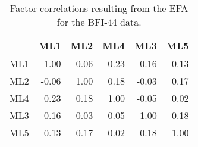 \begin{table}[ht]
\centering
\begin{tabular}{rrrrrr}
  \toprule
 & {\textbf{ML1}} & {\textbf{ML2}} & {\textbf{ML4}} & {\textbf{ML3}} & {\textbf{ML5}} \\ 
  \midrule
ML1 & 1.00 & -0.06 & 0.23 & -0.16 & 0.13 \\ 
  ML2 & -0.06 & 1.00 & 0.18 & -0.03 & 0.17 \\ 
  ML4 & 0.23 & 0.18 & 1.00 & -0.05 & 0.02 \\ 
  ML3 & -0.16 & -0.03 & -0.05 & 1.00 & 0.18 \\ 
  ML5 & 0.13 & 0.17 & 0.02 & 0.18 & 1.00 \\ 
   \bottomrule
\end{tabular}
\caption{Factor correlations resulting from the EFA for the BFI-44 data.} 
\label{tab:corrsbfi}
\end{table}
